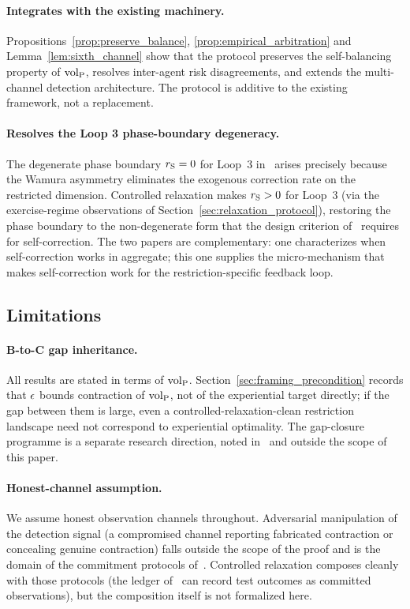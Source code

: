 \paragraph{Integrates with the existing machinery.}
Propositions~\ref{prop:preserve_balance},
\ref{prop:empirical_arbitration} and Lemma~\ref{lem:sixth_channel}
show that the protocol preserves the self-balancing property of
${\operatorname{vol}_{\mathrm{P}}}$, resolves inter-agent risk disagreements, and extends
the multi-channel detection architecture.  The protocol is
additive to the existing framework, not a replacement.

\paragraph{Resolves the Loop 3 phase-boundary degeneracy.}
The degenerate phase boundary $r_{\mathrm{S}} = 0$ for Loop~3
in~\citep[Proposition~4]{lasser2026phase} arises precisely
because the Wamura asymmetry eliminates the exogenous
correction rate on the restricted dimension.  Controlled
relaxation makes $r_{\mathrm{S}} > 0$ for Loop~3 (via the exercise-regime
observations of Section~\ref{sec:relaxation_protocol}),
restoring the phase boundary to the non-degenerate form that
the design criterion
of~\citep[Theorem~2]{lasser2026phase} requires for
self-correction.  The two papers are complementary: one
characterizes when self-correction works in aggregate; this one
supplies the micro-mechanism that makes self-correction work
for the restriction-specific feedback loop.

\subsection{Limitations}

\paragraph{B-to-C gap inheritance.}
All results are stated in terms of ${\operatorname{vol}_{\mathrm{P}}}$.
Section~\ref{sec:framing_precondition} records that $\epsilon$
bounds contraction of ${\operatorname{vol}_{\mathrm{P}}}$, not of the experiential target
directly; if the gap between them is large, even a
controlled-relaxation-clean restriction landscape need not
correspond to experiential optimality.  The gap-closure programme
is a separate research direction, noted
in~\citep{lasser2026gfm} and outside the scope of this paper.

\paragraph{Honest-channel assumption.}
We assume honest observation channels throughout.  Adversarial
manipulation of the detection signal (a compromised channel
reporting fabricated contraction or concealing genuine
contraction) falls outside the scope of the proof and is the
domain of the commitment protocols of~\citep{lasser2026exo}.
Controlled relaxation composes cleanly with those
protocols (the ledger of~\citep[Section~5]{lasser2026exo} can
record test outcomes as committed observations), but the
composition itself is not formalized here.

